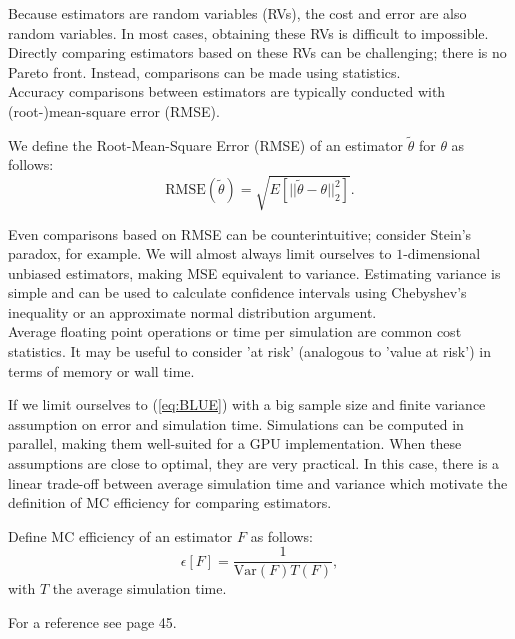 \documentclass[a4paper,12pt]{article}
\begin{document}
Because estimators are random variables (RVs), the cost and error are also random
variables. In most cases, obtaining these RVs is difficult to impossible.
Directly comparing estimators based on these RVs can be challenging;
there is no Pareto front. Instead, comparisons can be made
using statistics. \\

Accuracy comparisons between estimators
are typically conducted with (root-)mean-square error (RMSE).
\begin{definition}
    We define the Root-Mean-Square Error (RMSE) of an estimator $\tilde{\theta}$ for $\theta$  as follows:
    \begin{equation}
        \text{RMSE}(\tilde{\theta}) = \sqrt{E[||\tilde{\theta}-\theta||^{2}_{2}]}.
    \end{equation}
\end{definition}

Even comparisons based on RMSE can be counterintuitive; consider Stein's paradox,
for example. We will almost always limit ourselves to $1$-dimensional
unbiased estimators, making MSE equivalent to variance.
Estimating variance is simple and can be used to calculate
confidence intervals using Chebyshev's inequality or an
approximate normal distribution argument.\\

Average floating point operations or time per simulation are common cost statistics.
It may be useful to consider 'at risk' (analogous to 'value at risk')
in terms of memory or wall time.

If we limit ourselves to (\ref{eq:BLUE}) with a big sample size and
finite variance assumption on error and simulation time.
Simulations can be computed in parallel, making them well-suited for a GPU implementation.
When these assumptions are close to optimal, they are very practical.
In this case, there is a linear trade-off
between average simulation time and variance which motivate
the definition of MC efficiency for comparing estimators.

\begin{definition}
    Define MC efficiency of an
    estimator $F$ as follows:
    \begin{equation}
        \epsilon[F]=\frac{1}{\text{Var}(F) T(F)},
    \end{equation}
    with $T$ the average simulation time.
\end{definition}

\begin{related}
    For a reference see \cite{veach_robust_1997} page 45.
\end{related}
\end{document}

